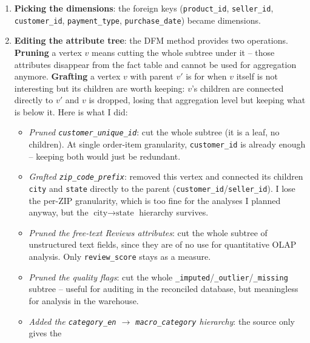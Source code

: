\documentclass[12pt,a4paper]{article}
\begin{document}
\begin{enumerate}
  \item \textbf{Picking the dimensions}: the foreign keys (\texttt{product\_id},
        \texttt{seller\_id}, \texttt{customer\_id}, \texttt{payment\_type},
        \texttt{purchase\_date}) became dimensions.

  \item \textbf{Editing the attribute tree}: the DFM method provides two operations.
        \textbf{Pruning} a vertex $v$ means cutting the whole subtree under it --
        those attributes disappear from the fact table and cannot be used for
        aggregation anymore. \textbf{Grafting} a vertex $v$ with parent $v'$ is for
        when $v$ itself is not interesting but its children are worth keeping: $v$'s
        children are connected directly to $v'$ and $v$ is dropped, losing that
        aggregation level but keeping what is below it. Here is what I did:
        \begin{itemize}
        \sloppy
          \item \textit{Pruned \texttt{customer\_unique\_id}}: cut the whole subtree
                (it is a leaf, no children). At single order-item granularity,
                \texttt{customer\_id} is already enough -- keeping both would just
                be redundant.
          \item \textit{Grafted \texttt{zip\_code\_prefix}}: removed this vertex and
                connected its children \texttt{city} and \texttt{state} directly to
                the parent (\texttt{customer\_id}/\texttt{seller\_id}). I lose the
                per-ZIP granularity, which is too fine for the analyses I planned
                anyway, but the $\text{city} \to \text{state}$ hierarchy survives.
          \item \textit{Pruned the free-text Reviews attributes}: cut the whole
                subtree of unstructured text fields, since they are of no use for
                quantitative OLAP analysis. Only \texttt{review\_score} stays as a
                measure.
          \item \textit{Pruned the quality flags}: cut the whole
                \texttt{\_imputed}/\texttt{\_outlier}/\texttt{\_missing} subtree --
                useful for auditing in the reconciled database, but meaningless for
                analysis in the warehouse.
          \item \textit{Added the \texttt{category\_en} $\to$
                \texttt{macro\_category} hierarchy}: the source only gives the

\end{itemize}
\end{enumerate}
\end{document}
